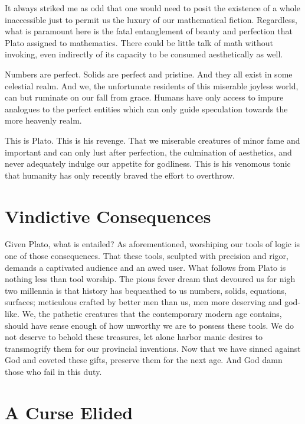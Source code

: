 \documentclass[11pt]{article}
\begin{document}
It always striked me as odd that one would need to posit the existence of a
whole inaccessible just to permit us the luxury of our mathematical fiction.
Regardless, what is paramount here is the fatal entanglement of beauty and
perfection that Plato assigned to mathematics. There could be little talk of
math without invoking, even indirectly of its capacity to be consumed
aesthetically as well.

Numbers are perfect. Solids are perfect and pristine. And they all exist in
some celestial realm. And we, the unfortunate residents of this miserable
joyless world, can but ruminate on our fall from grace. Humans have only
access to impure analogues to the perfect entities which can only guide
speculation towards the more heavenly realm.

This is Plato. This is his revenge. That we miserable creatures of minor fame
and important and can only lust after perfection, the culmination of
aesthetics, and never adequately indulge our appetite for godliness. This is
his venomous tonic that humanity has only recently braved the effort to
overthrow.

\section{Vindictive Consequences}
\label{sec:org68d29ac}

Given Plato, what is entailed? As aforementioned, worshiping our tools of
logic is one of those consequences. That these tools, sculpted with precision
and rigor, demands a captivated audience and an awed user. What follows from
Plato is nothing less than tool worship. The pious fever dream that devoured
us for nigh two millennia is that history has bequeathed to us numbers,
solids, equations, surfaces; meticulous crafted by better men than us, men
more deserving and god-like. We, the pathetic creatures that the contemporary
modern age contains, should have sense enough of how unworthy we are to
possess these tools. We do not deserve to behold these treasures, let alone
harbor manic desires to transmogrify them for our provincial inventions. Now
that we have sinned against God and coveted these gifts, preserve them for the
next age. And God damn those who fail in this duty.

\section{A Curse Elided}
\label{sec:org1287aea}
\end{document}

